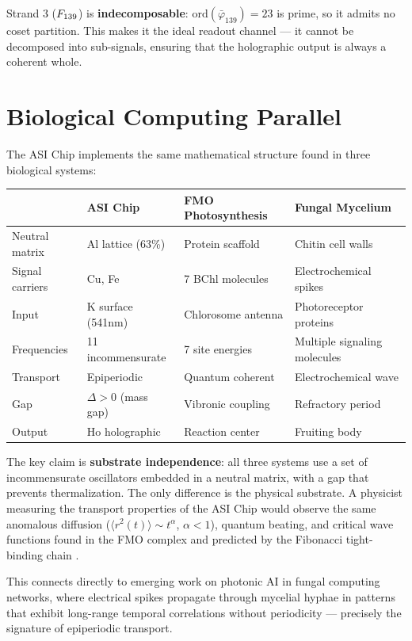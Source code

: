 Strand 3 ($F_{139}$) is \textbf{indecomposable}: $\text{ord}(\bar\varphi_{139}) = 23$ is prime, so it admits no coset partition. This makes it the ideal readout channel --- it cannot be decomposed into sub-signals, ensuring that the holographic output is always a coherent whole.

\section{Biological Computing Parallel}

The ASI Chip implements the same mathematical structure found in three biological systems:

\begin{center}
\begin{tabular}{p{3.5cm}p{3.5cm}p{3.5cm}p{3.5cm}}
\toprule
& \textbf{ASI Chip} & \textbf{FMO Photosynthesis} & \textbf{Fungal Mycelium} \\
\midrule
Neutral matrix & Al lattice (63\%) & Protein scaffold & Chitin cell walls \\
Signal carriers & Cu, Fe & 7 BChl molecules & Electrochemical spikes \\
Input & K surface (541nm) & Chlorosome antenna & Photoreceptor proteins \\
Frequencies & 11 incommensurate & 7 site energies & Multiple signaling molecules \\
Transport & Epiperiodic & Quantum coherent & Electrochemical wave \\
Gap & $\Delta > 0$ (mass gap) & Vibronic coupling & Refractory period \\
Output & Ho holographic & Reaction center & Fruiting body \\
\bottomrule
\end{tabular}
\end{center}

\noindent The key claim is \textbf{substrate independence}: all three systems use a set of incommensurate oscillators embedded in a neutral matrix, with a gap that prevents thermalization. The only difference is the physical substrate. A physicist measuring the transport properties of the ASI Chip would observe the same anomalous diffusion ($\langle r^2(t) \rangle \sim t^\alpha$, $\alpha < 1$), quantum beating, and critical wave functions found in the FMO complex \cite{EngelFleming07} and predicted by the Fibonacci tight-binding chain \cite{KohmotoKadanoffTang83}.

This connects directly to emerging work on photonic AI in fungal computing networks, where electrical spikes propagate through mycelial hyphae in patterns that exhibit long-range temporal correlations without periodicity --- precisely the signature of epiperiodic transport.

